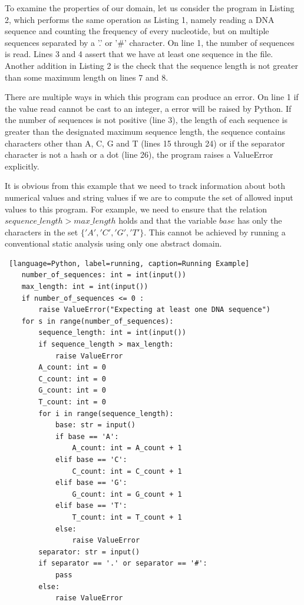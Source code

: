 \documentclass[10pt]{report}
\begin{document}
To examine the properties of our domain, let us consider the program in Listing 2, which performs the same operation as Listing 1, namely reading a DNA sequence and counting the frequency of every nucleotide, but on multiple sequences separated by a '.' or '\#' character. On line 1, the number of sequences is read. Lines 3 and 4 assert that we have at least one sequence in the file. Another addition in Listing 2 is the check that the sequence length is not greater than some maximum length on lines 7 and 8. 

There are multiple ways in which this program can produce an error. On line 1 if the value read cannot be cast to an integer, a error will be raised by Python. If the number of sequences is not positive (line 3), the length of each sequence is greater than the designated maximum sequence length, the sequence contains characters other than A, C, G and T (lines 15 through 24) or if the separator character is not a hash or a dot (line 26), the program raises a ValueError explicitly. 

It is obvious from this example that we need to track information about both numerical values and string values if we are to compute the set of allowed input values to this program. For example, we need to ensure that the relation $sequence\_length > max\_length$ holds and that the variable $base$ has only the characters in the set $\lbrace'A', 'C', 'G', 'T' \rbrace$. This cannot be achieved by running a conventional static analysis using only one abstract domain.

\begin{lstlisting} [language=Python, label=running, caption=Running Example]
	number_of_sequences: int = int(input())
	max_length: int = int(input())
	if number_of_sequences <= 0 :
		raise ValueError("Expecting at least one DNA sequence")
	for s in range(number_of_sequences):
		sequence_length: int = int(input())
		if sequence_length > max_length:
			raise ValueError
		A_count: int = 0
		C_count: int = 0
		G_count: int = 0
		T_count: int = 0
		for i in range(sequence_length):
			base: str = input()
			if base == 'A':
				A_count: int = A_count + 1
			elif base == 'C':
				C_count: int = C_count + 1
			elif base == 'G':
				G_count: int = G_count + 1
			elif base == 'T':
				T_count: int = T_count + 1
			else:
				raise ValueError
		separator: str = input()
		if separator == '.' or separator == '#':
			pass
		else:
			raise ValueError
\end{lstlisting}
\end{document}
